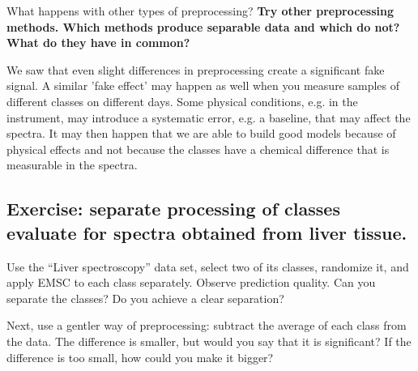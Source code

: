 What happens with other types of preprocessing? \textbf{Try other preprocessing methods. Which methods produce separable data and which do not? What do they have in common?}

We saw that even slight differences in preprocessing create a significant fake signal.
A similar 'fake effect' may happen as well when you measure samples of different classes on different days. Some physical conditions, e.g. in the instrument, may introduce a systematic error, e.g. a baseline, that may affect the spectra. It may then happen that we are able to build good models because of physical effects and not because the classes have a chemical difference that is measurable in the spectra.

\subsection{Exercise: separate processing of classes evaluate for spectra obtained from liver tissue.}

Use the ``Liver spectroscopy'' data set, select two of its classes, randomize it, and apply EMSC to each class separately. Observe prediction quality. Can you separate the classes? Do you achieve a clear separation?

Next, use a gentler way of preprocessing: subtract the average of each class from the data. The difference is smaller, but would you say that it is significant? If the difference is too small, how could you make it bigger?



\begin{center}
\end{center}
\begin{figure}[h]
\centering
\vspace{-0.5cm}
\end{figure}


